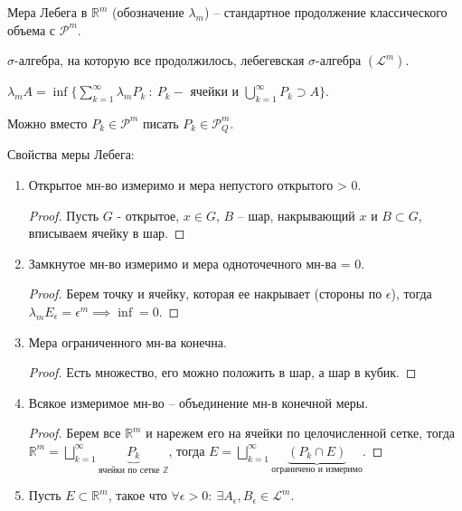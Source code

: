 \begin{definition}
    Мера Лебега в $\mathbb{R}^m$ (обозначение $\lambda_m$) -- стандартное продолжение классического объема с $\mathcal{P}^m$.

    $\sigma$-алгебра, на которую все продолжилось, лебегевская $\sigma$-алгебра $(\mathscr{L}^m)$. 
\end{definition}
\begin{remark}
    $\lambda_m A = \inf \{ \sum_{k=1}^{\infty} \lambda_m P_k \ : \ P_k - \text{ ячейки и } \bigcup_{k=1}^{\infty} P_k \supset A \}$.

    Можно вместо $P_k \in \mathcal{P}^m$ писать $P_k \in \mathcal{P}_Q^m$.
\end{remark}

\begin{properties}
    Свойства меры Лебега:

    \begin{enumerate}
        \item {
            Открытое мн-во измеримо и мера непустого открытого > 0.

            \begin{proof}
                Пусть $G$ - открытое, $x \in G$, $B$ -- шар, накрывающий $x$ и $B \subset G$, вписываем ячейку в шар.
            \end{proof}
        }
        \item {
            Замкнутое мн-во измеримо и мера одноточечного мн-ва = 0.

            \begin{proof}
                Берем точку и ячейку, которая ее накрывает (стороны по $\epsilon$), тогда $\lambda_m E_{\epsilon} = \epsilon^m \implies \inf = 0$.
            \end{proof}
        }
        \item {
            Мера ограниченного мн-ва конечна.

            \begin{proof}
                Есть множество, его можно положить в шар, а шар в кубик.

            \end{proof}
        }
        \item {
            Всякое измеримое мн-во -- объединение мн-в конечной меры.

            \begin{proof}
                Берем все $\mathbb{R}^m$ и нарежем его на ячейки по целочисленной сетке, тогда $\mathbb{R}^m = \bigsqcup_{k=1}^{\infty} \underbrace{P_k}_{\text{ячейки по сетке $\mathbb{Z}$}}$, тогда $E = \bigsqcup_{k=1}^{\infty}\underbrace{(P_k \cap E)}_{\text{ограничено и измеримо}}$.
            \end{proof}
        }
        \item {
            Пусть $E \subset \mathbb{R}^m$, такое что $\forall \epsilon > 0: \ \exists A_{\epsilon}, B_{\epsilon} \in \mathscr{L}^m$.
            
}
\end{enumerate}
\end{properties}
